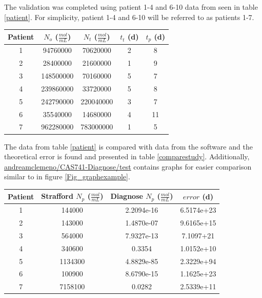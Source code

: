 \documentclass[12pt, titlepage]{article}
\begin{document}
The validation was completed using patient 1-4 and 6-10 data from \citet{Stafford2000} seen in table \ref{patient}. For simplicity, patient 1-4 and 6-10 will be referred to as patients 1-7.

\begin{center}
 \begin{tabular}{||c||c|c|c|c||} 
 \hline
  \bf{Patient}  & \textbf{$N_{o}$ ($\frac{mol}{mL}$)} & \textbf{$N_{t}$ ($\frac{mol}{mL}$)} & \textbf{$t_{t}$ (d)} & \textbf{$t_{p}$ (d)}\\ [0.5ex] 
  \hline
   1 & 94760000	 & 70620000	 & 2 & 8\\
  \hline
   2 & 28400000	 & 21600000	 & 1 & 9\\
  \hline
   3 & 148500000	 & 70160000	 & 5 & 7\\
  \hline
   4 & 239860000	 & 33720000	 & 5 & 8\\
  \hline
   5 & 242790000	 & 220040000	 & 3 & 7\\
  \hline
   6 & 35540000	 & 14680000 & 4 & 11\\
  \hline
   7 & 962280000 & 783000000	 & 1 & 5\\
  \hline
\end{tabular}
\label{patient}
\end{center}	

The data from table \ref{patient} is compared with data from the \progname{} software and the theoretical error is found and presented in table \ref{comparestudy}. Additionally, \href{https://github.com/andreamclemeno/CAS741-Diagnose/tree/master/test}{andreamclemeno/CAS741-Diagnose/test} contains graphs for easier comparison similar to in figure \ref{Fig_graphexample}.  

\begin{center}
 \begin{tabular}{||c||c|c|c||} 
 \hline
  \bf{Patient}  & \textbf{Strafford $N_{p}$ ($\frac{mol}{mL}$)} & \textbf{Diagnose $N_{p}$ ($\frac{mol}{mL}$)} & \textbf{$error$ (d)} \\ [0.5ex] 
  \hline
   1 & 144000	 & 2.2094e-16	 & 6.5174e+23 \\
  \hline
   2 & 	143000 & 1.4870e-07	 &  9.6165e+15\\
  \hline
   3 & 	564000 & 7.9327e-13	 &  7.1097+21\\
  \hline
   4 & 	340600 & 0.3354	 &  1.0152e+10\\
  \hline
   5 & 1134300	 & 4.8829e-85	 &  2.3229e+94\\
  \hline
   6 & 100900	 & 8.6790e-15 &  1.1625e+23\\
  \hline
   7 & 7158100 & 0.0282	 &  2.5339e+11\\
  \hline
\end{tabular}
\label{comparestudy}
\end{center}	
\end{document}
